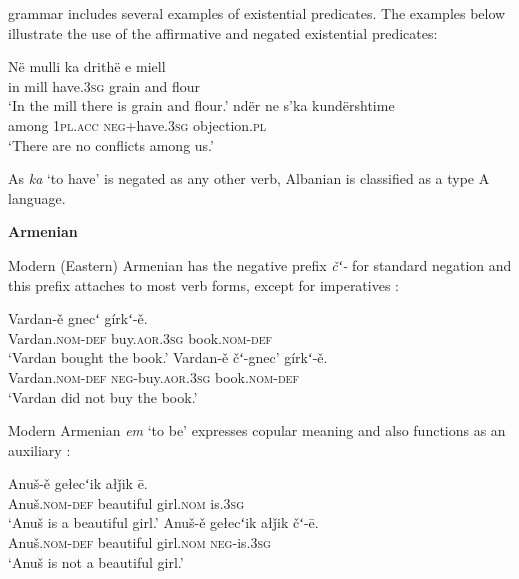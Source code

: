 \documentclass[output=paper]{langsci/langscibook}
\begin{document}
\begin{unindented}
 grammar includes several examples of existential predicates. The examples below illustrate the use of the affirmative and negated existential predicates:
%
\begin{exe}\ex \gll Në mulli ka drithë e miell \\
in mill have.\textsc{3sg} grain and flour \\
    \glt `In the mill there is grain and flour.' \parencite[12/257]{Camaj1984}
\ex \gll ndër ne s’ka kundërshtime \\
among \textsc{1pl}.\textsc{acc} \textsc{neg}+have.\textsc{3sg} objection.\textsc{pl} \\
    \glt `There are no conflicts among us.' \citep[70]{Camaj1984}
    \end{exe} 

As \textit{ka} `to have' is negated as any other verb, Albanian is classified as a type A language. 

\textbf{Armenian}

Modern (Eastern) Armenian has the negative prefix \textit{čʻ-} for standard
negation and this prefix attaches to most verb forms, except for
imperatives \parencite[522]{DumTragut2009}:
%
\begin{exe}\ex \gll Vardan-ě gnecʻ gírkʻ-ě.  \\
Vardan.\textsc{nom}-\textsc{def} buy.\textsc{aor}.\textsc{3sg} book.\textsc{nom-def} \\
    \glt `Vardan bought the book.' \parencite[51]{DumTragut2009}
\ex \gll Vardan-ě čʻ-gnec’ gírkʻ-ě.  \\
Vardan.\textsc{nom}-\textsc{def} \textsc{neg}-buy.\textsc{aor}.\textsc{3sg} book.\textsc{nom-def} \\
    \glt `Vardan did not buy the book.' \parencite[51]{DumTragut2009}
    \end{exe} 

Modern Armenian \textit{em} `to be' expresses copular meaning and also
functions as an auxiliary \parencite[215]{DumTragut2009}:

\begin{exe}\ex \gll Anuš-ě gełecʻik   ałǰik ē. \\
Anuš.\textsc{nom}-\textsc{def} beautiful girl.\textsc{nom} is.\textsc{3sg} \\
    \glt `Anuš is a beautiful girl.' \parencite[215]{DumTragut2009}
\ex \gll Anuš-ě gełecʻik ałǰik čʻ-ē.  \\
Anuš.\textsc{nom}-\textsc{def} beautiful girl.\textsc{nom} \textsc{neg}-is.\textsc{3sg} \\
    \glt `Anuš is not a beautiful girl.' \parencite[215]{DumTragut2009}
    \end{exe}


\end{unindented}
\end{document}
